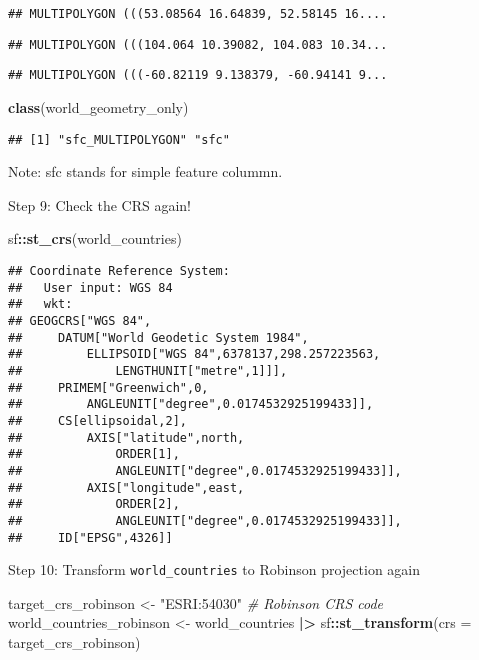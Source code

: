 \documentclass[
]{article}
\newenvironment{Shaded}{\begin{snugshade}}{\end{snugshade}}
\newcommand{\AttributeTok}[1]{\textcolor[rgb]{0.13,0.29,0.53}{#1}}
\newcommand{\CommentTok}[1]{\textcolor[rgb]{0.56,0.35,0.01}{\textit{#1}}}
\newcommand{\FunctionTok}[1]{\textcolor[rgb]{0.13,0.29,0.53}{\textbf{#1}}}
\newcommand{\NormalTok}[1]{#1}
\newcommand{\OtherTok}[1]{\textcolor[rgb]{0.56,0.35,0.01}{#1}}
\newcommand{\SpecialCharTok}[1]{\textcolor[rgb]{0.81,0.36,0.00}{\textbf{#1}}}
\newcommand{\StringTok}[1]{\textcolor[rgb]{0.31,0.60,0.02}{#1}}
\begin{document}
\begin{verbatim}
## MULTIPOLYGON (((53.08564 16.64839, 52.58145 16....
\end{verbatim}

\begin{verbatim}
## MULTIPOLYGON (((104.064 10.39082, 104.083 10.34...
\end{verbatim}

\begin{verbatim}
## MULTIPOLYGON (((-60.82119 9.138379, -60.94141 9...
\end{verbatim}

\begin{Shaded}
\begin{Highlighting}[]
\FunctionTok{class}\NormalTok{(world\_geometry\_only)}
\end{Highlighting}
\end{Shaded}

\begin{verbatim}
## [1] "sfc_MULTIPOLYGON" "sfc"
\end{verbatim}

Note: sfc stands for simple feature colummn.

Step 9: Check the CRS again!

\begin{Shaded}
\begin{Highlighting}[]
\NormalTok{sf}\SpecialCharTok{::}\FunctionTok{st\_crs}\NormalTok{(world\_countries)}
\end{Highlighting}
\end{Shaded}

\begin{verbatim}
## Coordinate Reference System:
##   User input: WGS 84 
##   wkt:
## GEOGCRS["WGS 84",
##     DATUM["World Geodetic System 1984",
##         ELLIPSOID["WGS 84",6378137,298.257223563,
##             LENGTHUNIT["metre",1]]],
##     PRIMEM["Greenwich",0,
##         ANGLEUNIT["degree",0.0174532925199433]],
##     CS[ellipsoidal,2],
##         AXIS["latitude",north,
##             ORDER[1],
##             ANGLEUNIT["degree",0.0174532925199433]],
##         AXIS["longitude",east,
##             ORDER[2],
##             ANGLEUNIT["degree",0.0174532925199433]],
##     ID["EPSG",4326]]
\end{verbatim}

Step 10: Transform \texttt{world\_countries} to Robinson projection
again

\begin{Shaded}
\begin{Highlighting}[]
\NormalTok{target\_crs\_robinson }\OtherTok{\textless{}{-}} \StringTok{"ESRI:54030"} \CommentTok{\# Robinson CRS code}
\NormalTok{world\_countries\_robinson }\OtherTok{\textless{}{-}}\NormalTok{ world\_countries }\SpecialCharTok{|\textgreater{}} 
\NormalTok{  sf}\SpecialCharTok{::}\FunctionTok{st\_transform}\NormalTok{(}\AttributeTok{crs =}\NormalTok{ target\_crs\_robinson)}
\end{Highlighting}
\end{Shaded}
\end{document}
